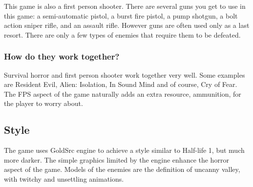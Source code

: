 \documentclass[a4paper,10pt,english]{article}
\begin{document}
This game is also a first person shooter. There are several guns you get to use in this game: a semi-automatic pistol, a burst fire pistol, a pump shotgun, a bolt action sniper rifle, and an assault rifle. However guns are often used only as a last resort. There are only a few types of enemies that require them to be defeated.

\subsubsection*{How do they work together?}

Survival horror and first person shooter work together very well. Some examples are Resident Evil, Alien: Isolation, In Sound Mind and of course, Cry of Fear. The FPS aspect of the game naturally adds an extra resource, ammunition, for the player to worry about.

\subsection*{Style}

The game uses GoldSrc engine to achieve a style similar to Half-life 1, but much more darker. The simple graphics limited by the engine enhance the horror aspect of the game. Models of the enemies are the definition of uncanny valley, with twitchy and unsettling animations. 
\end{document}
